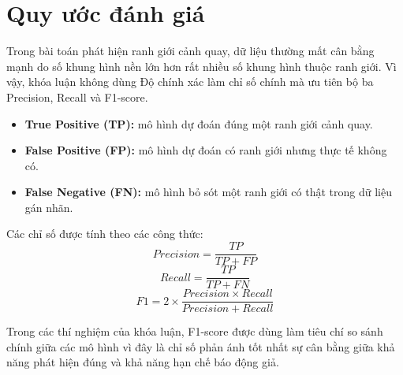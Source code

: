 \section{Quy ước đánh giá}

Trong bài toán phát hiện ranh giới cảnh quay, dữ liệu thường mất cân bằng mạnh do số khung hình nền lớn hơn rất nhiều số khung hình thuộc ranh giới. Vì vậy, khóa luận không dùng Độ chính xác làm chỉ số chính mà ưu tiên bộ ba Precision, Recall và F1-score.

\begin{itemize}
    \item \textbf{True Positive (TP):} mô hình dự đoán đúng một ranh giới cảnh quay.
    \item \textbf{False Positive (FP):} mô hình dự đoán có ranh giới nhưng thực tế không có.
    \item \textbf{False Negative (FN):} mô hình bỏ sót một ranh giới có thật trong dữ liệu gán nhãn.
\end{itemize}

Các chỉ số được tính theo các công thức:
\begin{equation}
    Precision = \frac{TP}{TP + FP}
\end{equation}
\begin{equation}
    Recall = \frac{TP}{TP + FN}
\end{equation}
\begin{equation}
    F1 = 2 \times \frac{Precision \times Recall}{Precision + Recall}
\end{equation}

Trong các thí nghiệm của khóa luận, F1-score được dùng làm tiêu chí so sánh chính giữa các mô hình vì đây là chỉ số phản ánh tốt nhất sự cân bằng giữa khả năng phát hiện đúng và khả năng hạn chế báo động giả.
